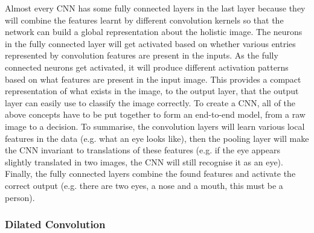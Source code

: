 \noindent
Almost every \gls{CNN} has some fully connected layers in the last layer because they will combine the features learnt by different convolution kernels so that the network can build a global representation about the holistic image. The neurons in the fully connected layer will get activated based on whether various entries represented by convolution features are present in the inputs. As the fully connected neurons get activated, it will produce different activation patterns based on what features are present in the input image. This provides a compact representation of what exists in the image, to the output layer, that the output layer can easily use to classify the image correctly.
\newline
\newline
To create a \gls{CNN}, all of the above concepts have to be put together to form an end-to-end model, from a raw image to a decision. To summarise, the convolution layers will learn various local features in the data (e.g. what an eye looks like), then the pooling layer will make the \gls{CNN} invariant to translations of these features (e.g. if the eye appears slightly translated in two images, the \gls{CNN} will still recognise it as an eye). Finally, the fully connected layers combine the found features and activate the correct output (e.g. there are two eyes, a nose and a mouth, this must be a person).

\subsubsection{Dilated Convolution}
\label{subsub:Dilated-Convolution}

